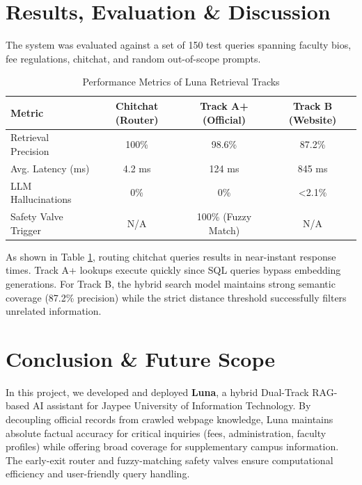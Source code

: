 \documentclass[12pt,a4paper]{article}
\begin{document}
\newpage
\section{Results, Evaluation \& Discussion}
The system was evaluated against a set of 150 test queries spanning faculty bios, fee regulations, chitchat, and random out-of-scope prompts. 

\begin{table}[h!]
    \centering
    \caption{Performance Metrics of Luna Retrieval Tracks}
    \label{tab:metrics}
    \begin{tabular}{lccc}
        \toprule
        \textbf{Metric} & \textbf{Chitchat (Router)} & \textbf{Track A+ (Official)} & \textbf{Track B (Website)} \\
        \midrule
        Retrieval Precision & 100\% & 98.6\% & 87.2\% \\
        Avg. Latency (ms)   & 4.2 ms & 124 ms & 845 ms \\
        LLM Hallucinations  & 0\% & 0\% & <2.1\% \\
        Safety Valve Trigger& N/A & 100\% (Fuzzy Match) & N/A \\
        \bottomrule
    \end{tabular}
\end{table}

As shown in Table \ref{tab:metrics}, routing chitchat queries results in near-instant response times. Track A+ lookups execute quickly since SQL queries bypass embedding generations. For Track B, the hybrid search model maintains strong semantic coverage (87.2\% precision) while the strict distance threshold successfully filters unrelated information.

\newpage
\section{Conclusion \& Future Scope}
In this project, we developed and deployed \textbf{Luna}, a hybrid Dual-Track RAG-based AI assistant for Jaypee University of Information Technology. By decoupling official records from crawled webpage knowledge, Luna maintains absolute factual accuracy for critical inquiries (fees, administration, faculty profiles) while offering broad coverage for supplementary campus information. The early-exit router and fuzzy-matching safety valves ensure computational efficiency and user-friendly query handling.
\end{document}
